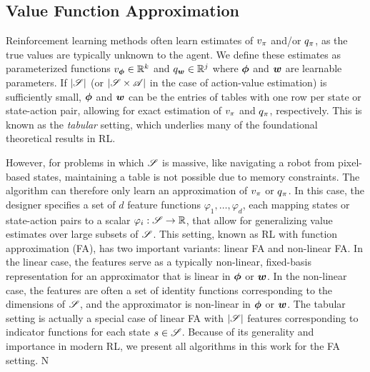 \subsection{Value Function Approximation} 
Reinforcement learning methods often learn estimates of $v_{\pi}$ and/or $q_{\pi}$, as the true values are typically unknown to the agent. We define these estimates as parameterized functions $v_{\bm \phi} \in \mathbb{R}^k$ and $q_{\bm w} \in \mathbb{R}^j$ where ${\bm \phi}$ and ${\bm w}$ are learnable parameters. If $|\mathscr{S}|$ (or $|\mathscr{S} \times \mathscr{A}|$ in the case of action-value estimation) is sufficiently small, ${\bm \phi}$ and ${\bm w}$ can be the entries of tables with one row per state or state-action pair, allowing for exact estimation of $v_{\pi}$ and $q_{\pi}$, respectively. This is known as the \textit{tabular} setting, which underlies many of the foundational theoretical results in RL. 

However, for problems in which $\mathscr{S}$ is massive, like navigating a robot from pixel-based states, maintaining a table is not possible due to memory constraints. The algorithm can therefore only learn an approximation of $v_{\pi}$ or $q_{\pi}$. In this case, the designer specifies a set of $d$ feature functions $\varphi_1, \dots, \varphi_d$, each mapping states or state-action pairs to a scalar $\varphi_i : \mathscr{S} \to \mathbb{R}$, that allow for generalizing value estimates over large subsets of $\mathscr{S}$. This setting, known as RL with function approximation (FA), has two important variants: linear FA and non-linear FA. In the linear case, the features serve as a typically non-linear, fixed-basis representation for an approximator that is linear in ${\bm \phi}$ or ${\bm w}$. In the non-linear case, the features are often a set of identity functions corresponding to the dimensions of $\mathscr{S}$, and the approximator is non-linear in ${\bm \phi}$ or ${\bm w}$. The tabular setting is actually a special case of linear FA with $|\mathscr{S}|$ features corresponding to indicator functions for each state $s \in \mathscr{S}$. Because of its generality and importance in modern RL, we present all algorithms in this work for the FA setting.
N
